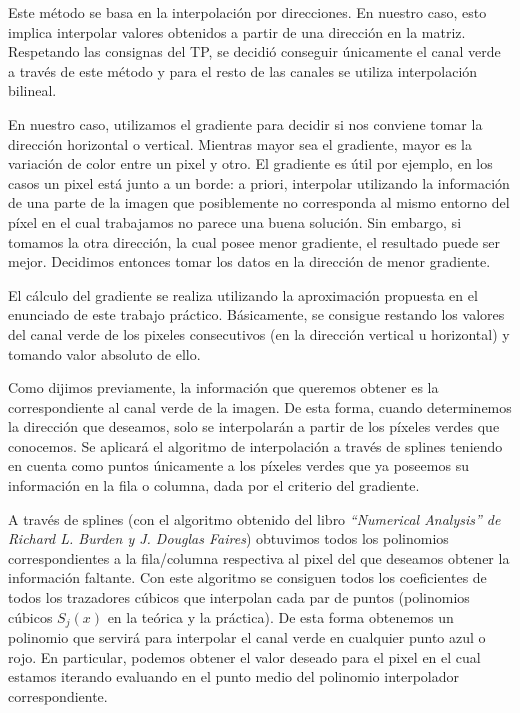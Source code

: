 Este método se basa en la interpolación por direcciones. En nuestro caso, esto implica interpolar valores obtenidos a partir de una dirección en la matriz. Respetando las consignas del TP, se decidió conseguir únicamente el canal verde a través de este método y para el resto de las canales se utiliza interpolación bilineal.
\par 
En nuestro caso, utilizamos el gradiente para decidir si nos conviene tomar la dirección horizontal o vertical. Mientras mayor sea el gradiente, mayor es la variación de color entre un pixel y otro. El gradiente es útil por ejemplo, en los casos un pixel está junto a un borde: a priori, interpolar utilizando la información de una parte de la imagen que posiblemente no corresponda al mismo entorno del píxel en el cual trabajamos no parece una buena solución. Sin embargo, si tomamos la otra dirección, la cual posee menor gradiente, el resultado puede ser mejor. Decidimos entonces tomar los datos en la dirección de menor gradiente.

El cálculo del gradiente se realiza utilizando la aproximación propuesta en el enunciado de este trabajo práctico. Básicamente, se consigue restando los valores del canal verde de los pixeles consecutivos (en la dirección vertical u horizontal) y tomando valor absoluto de ello.

Como dijimos previamente, la información que queremos obtener es la correspondiente al canal verde de la imagen. De esta forma, cuando determinemos la dirección que deseamos, solo se interpolarán a partir de los píxeles verdes que conocemos. Se aplicará el algoritmo de interpolación a través de splines teniendo en cuenta como puntos únicamente a los píxeles verdes que ya poseemos su información en la fila o columna, dada por el criterio del gradiente.

A través de splines (con el algoritmo obtenido del libro \textit{``Numerical Analysis'' de Richard L. Burden y J. Douglas Faires}) obtuvimos todos los polinomios correspondientes a la fila/columna respectiva al pixel del que deseamos obtener la información faltante. Con este algoritmo se consiguen todos los coeficientes de todos los trazadores cúbicos que interpolan cada par de puntos (polinomios cúbicos $S_j(x)$ en la teórica y la práctica). De esta forma obtenemos un polinomio que servirá para interpolar el canal verde en cualquier punto azul o rojo. En particular, podemos obtener el valor deseado para el pixel en el cual estamos iterando evaluando en el punto medio del polinomio interpolador correspondiente.


